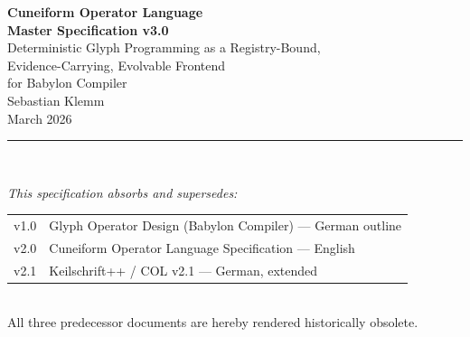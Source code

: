 \documentclass[11pt,a4paper,twoside]{article}
\theoremstyle{definition}
\theoremstyle{remark}
\begin{document}
\begin{titlepage}
\centering
\vspace*{3cm}
{\Huge\bfseries\color{normblue} Cuneiform Operator Language\\[6pt]
Master Specification v3.0}\\[1.5cm]
{\Large Deterministic Glyph Programming as a Registry-Bound,\\
Evidence-Carrying, Evolvable Frontend\\
for Babylon Compiler}\\[2.5cm]
{\large Sebastian Klemm}\\[0.5cm]
{\large March 2026}\\[3cm]
\rule{0.6\textwidth}{0.4pt}\\[1cm]
{\small\itshape This specification absorbs and supersedes:\\[4pt]
\begin{tabular}{rl}
v1.0 & Glyph Operator Design (Babylon Compiler) --- German outline\\
v2.0 & Cuneiform Operator Language Specification --- English\\
v2.1 & Keilschrift++ / COL v2.1 --- German, extended\\
\end{tabular}\\[8pt]
All three predecessor documents are hereby rendered historically obsolete.}
\end{titlepage}
\end{document}
